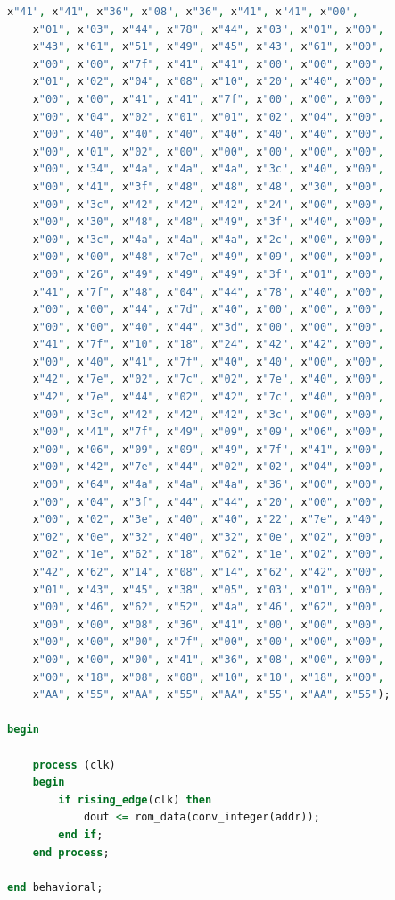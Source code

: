 \documentclass[a4paper,12pt]{article}
\begin{document}
\begin{lstlisting}[language=VHDL,basicstyle=\ttfamily\small,frame=single,caption={ascii\_rom.vhd}]
    x"41", x"41", x"36", x"08", x"36", x"41", x"41", x"00",
    x"01", x"03", x"44", x"78", x"44", x"03", x"01", x"00",
    x"43", x"61", x"51", x"49", x"45", x"43", x"61", x"00",
    x"00", x"00", x"7f", x"41", x"41", x"00", x"00", x"00",
    x"01", x"02", x"04", x"08", x"10", x"20", x"40", x"00",
    x"00", x"00", x"41", x"41", x"7f", x"00", x"00", x"00",
    x"00", x"04", x"02", x"01", x"01", x"02", x"04", x"00",
    x"00", x"40", x"40", x"40", x"40", x"40", x"40", x"00",
    x"00", x"01", x"02", x"00", x"00", x"00", x"00", x"00",
    x"00", x"34", x"4a", x"4a", x"4a", x"3c", x"40", x"00",
    x"00", x"41", x"3f", x"48", x"48", x"48", x"30", x"00",
    x"00", x"3c", x"42", x"42", x"42", x"24", x"00", x"00",
    x"00", x"30", x"48", x"48", x"49", x"3f", x"40", x"00",
    x"00", x"3c", x"4a", x"4a", x"4a", x"2c", x"00", x"00",
    x"00", x"00", x"48", x"7e", x"49", x"09", x"00", x"00",
    x"00", x"26", x"49", x"49", x"49", x"3f", x"01", x"00",
    x"41", x"7f", x"48", x"04", x"44", x"78", x"40", x"00",
    x"00", x"00", x"44", x"7d", x"40", x"00", x"00", x"00",
    x"00", x"00", x"40", x"44", x"3d", x"00", x"00", x"00",
    x"41", x"7f", x"10", x"18", x"24", x"42", x"42", x"00",
    x"00", x"40", x"41", x"7f", x"40", x"40", x"00", x"00",
    x"42", x"7e", x"02", x"7c", x"02", x"7e", x"40", x"00",
    x"42", x"7e", x"44", x"02", x"42", x"7c", x"40", x"00",
    x"00", x"3c", x"42", x"42", x"42", x"3c", x"00", x"00",
    x"00", x"41", x"7f", x"49", x"09", x"09", x"06", x"00",
    x"00", x"06", x"09", x"09", x"49", x"7f", x"41", x"00",
    x"00", x"42", x"7e", x"44", x"02", x"02", x"04", x"00",
    x"00", x"64", x"4a", x"4a", x"4a", x"36", x"00", x"00",
    x"00", x"04", x"3f", x"44", x"44", x"20", x"00", x"00",
    x"00", x"02", x"3e", x"40", x"40", x"22", x"7e", x"40",
    x"02", x"0e", x"32", x"40", x"32", x"0e", x"02", x"00",
    x"02", x"1e", x"62", x"18", x"62", x"1e", x"02", x"00",
    x"42", x"62", x"14", x"08", x"14", x"62", x"42", x"00",
    x"01", x"43", x"45", x"38", x"05", x"03", x"01", x"00",
    x"00", x"46", x"62", x"52", x"4a", x"46", x"62", x"00",
    x"00", x"00", x"08", x"36", x"41", x"00", x"00", x"00",
    x"00", x"00", x"00", x"7f", x"00", x"00", x"00", x"00",
    x"00", x"00", x"00", x"41", x"36", x"08", x"00", x"00",
    x"00", x"18", x"08", x"08", x"10", x"10", x"18", x"00",
    x"AA", x"55", x"AA", x"55", x"AA", x"55", x"AA", x"55");

begin

    process (clk)
    begin
        if rising_edge(clk) then
            dout <= rom_data(conv_integer(addr));
        end if;
    end process;

end behavioral;
\end{lstlisting}
\end{document}
